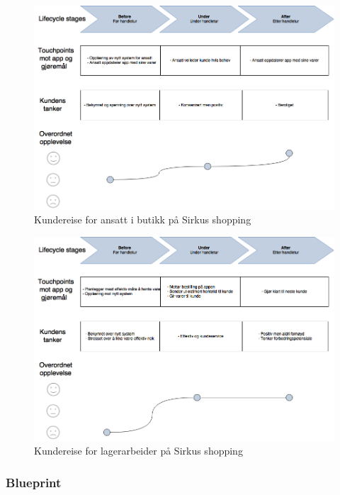 \begin{figure}[H]
\includegraphics[scale=0.4]{images/customerjourneyBlueprint/cjAnsatt}
\centering %
\caption{Kundereise for ansatt i butikk på Sirkus shopping}
\label{fig:customerAnsatt}
\end{figure}

\begin{figure}[H]
\includegraphics[scale=0.4]{images/customerjourneyBlueprint/cjLager}
\centering %
\caption{Kundereise for lagerarbeider på Sirkus shopping}
\label{fig:customerLager}
\end{figure}

\subsubsection{Blueprint}
\label{sec:blueprint}

